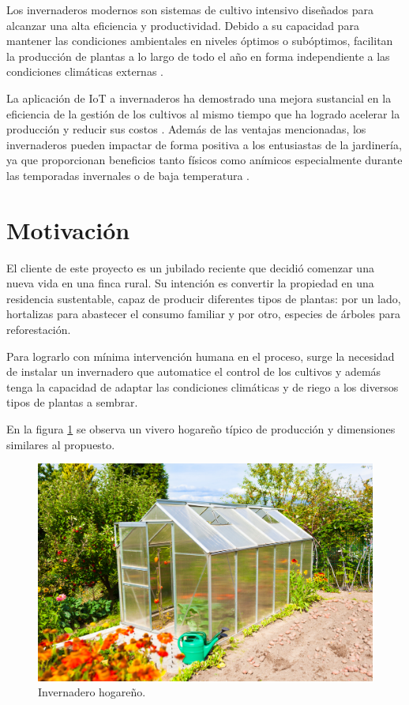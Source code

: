 Los invernaderos modernos son sistemas de cultivo intensivo diseñados para alcanzar una alta eficiencia y productividad. Debido a su capacidad para mantener las condiciones ambientales en niveles óptimos o subóptimos, facilitan la producción de plantas a lo largo de todo el año en forma independiente a las condiciones climáticas externas \citep{HistoryofControlledEnvironmentHorticultureGreenhouses}.

La aplicación de IoT a invernaderos ha demostrado una mejora sustancial en la eficiencia de la gestión de los cultivos al mismo tiempo que ha logrado acelerar la producción y reducir sus costos \citep{IoTparaInvernaderos}. Además de las ventajas mencionadas, los invernaderos pueden impactar de forma positiva a los entusiastas de la jardinería, ya que proporcionan beneficios tanto físicos como anímicos especialmente durante las temporadas invernales o de baja temperatura \citep{GreenHousesForHomeOwnersAndGardeners}. 


\section{Motivación}
\label{Motivación}

El cliente de este proyecto es un jubilado reciente que decidió comenzar una nueva vida en una finca rural. Su intención es convertir la propiedad en una residencia sustentable, capaz de producir diferentes tipos de plantas: por un lado, hortalizas para abastecer el consumo familiar y por otro, especies de árboles para reforestación. 

Para lograrlo con mínima intervención humana en el proceso, surge la necesidad de instalar un invernadero que automatice el control de los cultivos y además tenga la capacidad de adaptar las condiciones climáticas y de riego a los diversos tipos de plantas a sembrar. 

 
En la figura \ref{fig:imgInvernadero} se observa un vivero hogareño típico de producción y dimensiones similares al propuesto.




\begin{figure}[htpb]
\centering 
\includegraphics[width=.7\textwidth]{../Figures/invernadero1.jpg}
\caption[Invernadero hogareño]{Invernadero hogareño\protect\footnotemark.}
\label{fig:imgInvernadero}
\end{figure}


